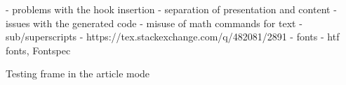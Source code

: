 - problems with the hook insertion
  - separation of presentation and content
- issues with the generated code
  - misuse of math commands for text 
- sub/superscripts - https://tex.stackexchange.com/q/482081/2891
- fonts - htf fonts, Fontspec

\begin{frame}
  Testing frame in the article mode
\end{frame}
